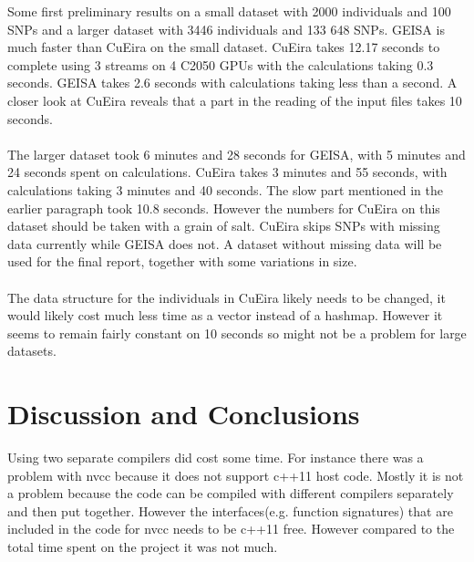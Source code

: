 \documentclass[10pt,a4paper]{report}
\begin{document}




Some first preliminary results on a small dataset with 2000 individuals and 100 SNPs and a larger dataset with 3446 individuals and 133 648 SNPs. GEISA is much faster than CuEira on the small dataset. CuEira takes 12.17 seconds to complete using 3 streams on 4 C2050 GPUs with the calculations taking 0.3 seconds. GEISA takes 2.6 seconds with calculations taking less than a second. A closer look at CuEira reveals that a part in the reading of the input files takes 10 seconds.\\
\\
The larger dataset took 6 minutes and 28 seconds for GEISA, with 5 minutes and 24 seconds spent on calculations. CuEira takes 3 minutes and 55 seconds, with calculations taking 3 minutes and 40 seconds. The slow part mentioned in the earlier paragraph took 10.8 seconds. However the numbers for CuEira on this dataset should be taken with a grain of salt. CuEira skips SNPs with missing data currently while GEISA does not. A dataset without missing data will be used for the final report, together with some variations in size.\\
\\
The data structure for the individuals in CuEira likely needs to be changed, it would likely cost much less time as a vector instead of a hashmap. However it seems to remain fairly constant on 10 seconds so might not be a problem for large datasets.

\chapter{Discussion and Conclusions}



Using two separate compilers did cost some time. For instance there was a problem with nvcc because it does not support c++11 host code. Mostly it is not a problem because the code can be compiled with different compilers separately and then put together\cite{cuda}. However the interfaces(e.g. function signatures) that are included in the code for nvcc needs to be c++11 free. However compared to the total time spent on the project it was not much.
\end{document}
